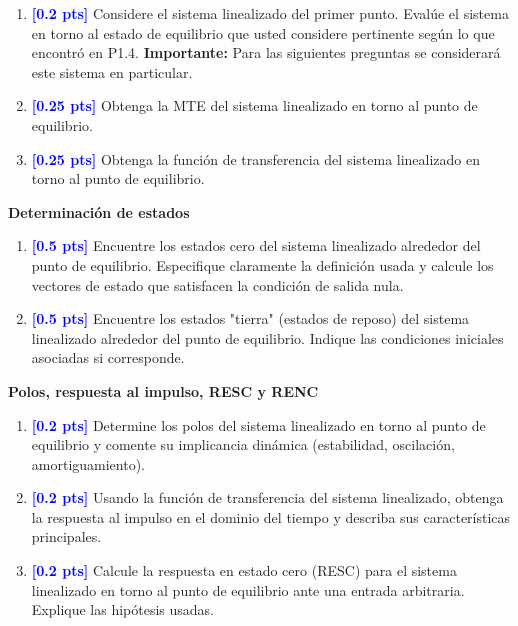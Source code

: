 \documentclass[
  11pt,
  letterpaper,
   addpoints,
   answers
  ]{exam}
\begin{document}
\begin{questions}
\begin{enumerate}
  \item \textcolor{blue}{\textbf{[0.2 pts]}} Considere el sistema linealizado del primer punto. Evalúe el sistema en torno al estado de equilibrio que usted considere pertinente según lo que encontró en P1.4. \textbf{Importante:} Para las siguientes preguntas se considerará este sistema en particular.

  \item \textcolor{blue}{\textbf{[0.25 pts]}} Obtenga la MTE del sistema linealizado en torno al punto de equilibrio.

  \item \textcolor{blue}{\textbf{[0.25 pts]}} Obtenga la función de transferencia del sistema linealizado en torno al punto de equilibrio.
\end{enumerate}

\question \textbf{Determinación de estados}
\begin{enumerate}
  \item \textcolor{blue}{\textbf{[0.5 pts]}} Encuentre los estados cero del sistema linealizado alrededor del punto de equilibrio. Especifique claramente la definición usada y calcule los vectores de estado que satisfacen la condición de salida nula.

  \item \textcolor{blue}{\textbf{[0.5 pts]}} Encuentre los estados "tierra" (estados de reposo) del sistema linealizado alrededor del punto de equilibrio. Indique las condiciones iniciales asociadas si corresponde.
\end{enumerate}

\question \textbf{Polos, respuesta al impulso, RESC y RENC}
\begin{enumerate}
  \item \textcolor{blue}{\textbf{[0.2 pts]}} Determine los polos del sistema linealizado en torno al punto de equilibrio y comente su implicancia dinámica (estabilidad, oscilación, amortiguamiento).

  \item \textcolor{blue}{\textbf{[0.2 pts]}} Usando la función de transferencia del sistema linealizado, obtenga la respuesta al impulso en el dominio del tiempo y describa sus características principales.

  \item \textcolor{blue}{\textbf{[0.2 pts]}} Calcule la respuesta en estado cero (RESC) para el sistema linealizado en torno al punto de equilibrio ante una entrada arbitraria. Explique las hipótesis usadas.


\end{enumerate}
\end{questions}
\end{document}
